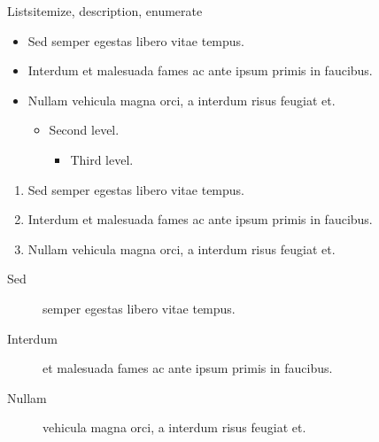 \documentclass{beamer}
\begin{document}
\begin{frame}{Lists}{itemize, description, enumerate}
  \begin{itemize}
  \item Sed semper egestas libero vitae tempus.
  \item Interdum et malesuada fames ac ante ipsum primis in faucibus.
  \item Nullam vehicula magna orci, a interdum risus feugiat et.
    \begin{itemize}
    \item Second level.
      \begin{itemize}
      \item Third level.
      \end{itemize}
    \end{itemize}
  \end{itemize}

  \begin{enumerate}
  \item Sed semper egestas libero vitae tempus.
  \item Interdum et malesuada fames ac ante ipsum primis in faucibus.
  \item Nullam vehicula magna orci, a interdum risus feugiat et.
  \end{enumerate}

  \begin{description}
  \item[Sed] semper egestas libero vitae tempus.
  \item[Interdum] et malesuada fames ac ante ipsum primis in faucibus.
  \item[Nullam] vehicula magna orci, a interdum risus feugiat et.
  \end{description}
\end{frame}
\end{document}
